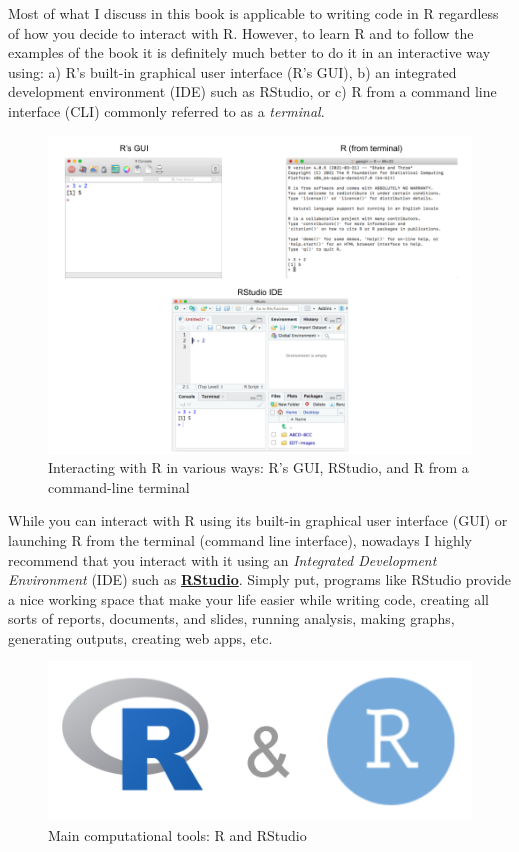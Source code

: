 \documentclass[
]{book}
\begin{document}
Most of what I discuss in this book is applicable to writing code in R
regardless of how you decide to interact with R. However, to learn R and to
follow the examples of the book it is definitely much better to do it in an
interactive way using: a) R's built-in graphical user interface (R's GUI),
b) an integrated development environment (IDE) such as RStudio, or
c) R from a command line interface (CLI) commonly referred to as a \emph{terminal}.

\begin{figure}

{\centering \includegraphics[width=0.9\linewidth]{images/install/r-interactive-ways} 

}

\caption{Interacting with R in various ways: R's GUI, RStudio, and R from a command-line terminal}\label{fig:unnamed-chunk-3}
\end{figure}

While you can interact with R using its built-in graphical user interface (GUI)
or launching R from the terminal (command line interface), nowadays I highly
recommend that you interact with it using an
\emph{Integrated Development Environment} (IDE) such as
\href{https://www.rstudio.com/}{\textbf{RStudio}}. Simply put,
programs like RStudio provide a nice working space that make your life easier
while writing code, creating all sorts of reports, documents, and slides,
running analysis, making graphs, generating outputs, creating web apps, etc.

\begin{figure}

{\centering \includegraphics[width=0.3\linewidth]{images/rstudio/r-rstudio-logos} 

}

\caption{Main computational tools: R and RStudio}\label{fig:unnamed-chunk-4}
\end{figure}
\end{document}

